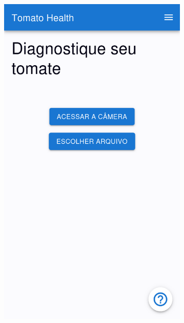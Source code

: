 \begin{figure}[htp]
\begin{subfigure}{0.3\textwidth}
        \includegraphics[width=\linewidth, height=0.4\textheight, keepaspectratio]{images/diagnostic3.png}
    \end{subfigure}
    \begin{subfigure}{0.3\textwidth}
        \centering

\end{subfigure}
\end{figure}
